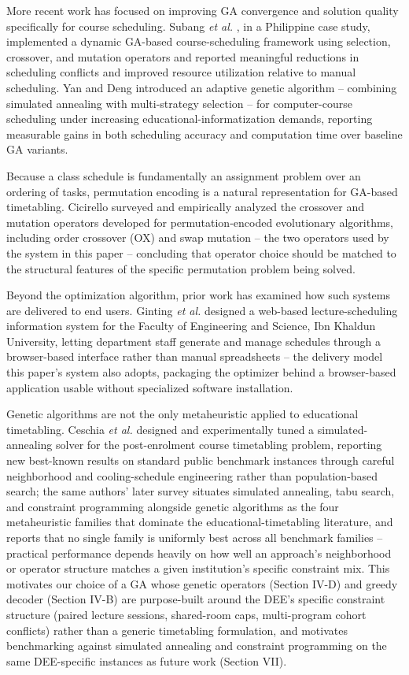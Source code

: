 \documentclass[conference]{IEEEtran}
\begin{document}
More recent work has focused on improving GA convergence and solution quality specifically for course scheduling. Subang \emph{et al.} \cite{subang2024}, in a Philippine case study, implemented a dynamic GA-based course-scheduling framework using selection, crossover, and mutation operators and reported meaningful reductions in scheduling conflicts and improved resource utilization relative to manual scheduling. Yan and Deng \cite{yan2025} introduced an adaptive genetic algorithm -- combining simulated annealing with multi-strategy selection -- for computer-course scheduling under increasing educational-informatization demands, reporting measurable gains in both scheduling accuracy and computation time over baseline GA variants.

Because a class schedule is fundamentally an assignment problem over an ordering of tasks, permutation encoding is a natural representation for GA-based timetabling. Cicirello \cite{cicirello2023} surveyed and empirically analyzed the crossover and mutation operators developed for permutation-encoded evolutionary algorithms, including order crossover (OX) and swap mutation -- the two operators used by the system in this paper -- concluding that operator choice should be matched to the structural features of the specific permutation problem being solved.

Beyond the optimization algorithm, prior work has examined how such systems are delivered to end users. Ginting \emph{et al.} \cite{ginting2022} designed a web-based lecture-scheduling information system for the Faculty of Engineering and Science, Ibn Khaldun University, letting department staff generate and manage schedules through a browser-based interface rather than manual spreadsheets -- the delivery model this paper's system also adopts, packaging the optimizer behind a browser-based application usable without specialized software installation.

Genetic algorithms are not the only metaheuristic applied to educational timetabling. Ceschia \emph{et al.} \cite{ceschia2012sa} designed and experimentally tuned a simulated-annealing solver for the post-enrolment course timetabling problem, reporting new best-known results on standard public benchmark instances through careful neighborhood and cooling-schedule engineering rather than population-based search; the same authors' later survey \cite{ceschia2022survey} situates simulated annealing, tabu search, and constraint programming alongside genetic algorithms as the four metaheuristic families that dominate the educational-timetabling literature, and reports that no single family is uniformly best across all benchmark families -- practical performance depends heavily on how well an approach's neighborhood or operator structure matches a given institution's specific constraint mix. This motivates our choice of a GA whose genetic operators (Section IV-D) and greedy decoder (Section IV-B) are purpose-built around the DEE's specific constraint structure (paired lecture sessions, shared-room caps, multi-program cohort conflicts) rather than a generic timetabling formulation, and motivates benchmarking against simulated annealing and constraint programming on the same DEE-specific instances as future work (Section VII).
\end{document}
